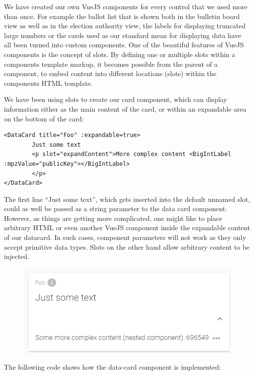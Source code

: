 We have created our own VueJS components for every control that we used more than once. For example the ballot list that is shown both in the bulletin board view as well as in the election authority view, the labels for displaying truncated large numbers or the cards used as our standard mean for displaying data have all been turned into custom components. One of the beautiful features of VueJS components is the concept of slots. By defining one or multiple slots within a components template markup, it becomes possible from the parent of a component, to embed content into different locations (slots) within the components HTML template.

We have been using slots to create our card component, which can display information either as the main content of the card, or within an expandable area on the bottom of the card:

\begin{verbatim}
<DataCard title="Foo" :expandable=true>
		Just some text
		<p slot="expandContent">More complex content <BigIntLabel :mpzValue="publicKey"></BigIntLabel>
		</p>
</DataCard>
\end{verbatim}
The first line "`Just some text"', which gets inserted into the default unnamed slot, could as well be passed as a string parameter to the data card component. However, as things are getting more complicated, one might like to place arbitrary HTML or even another VueJS component inside the expandable content of our datacard. In such cases, component parameters will not work as they only accept primitive data types. Slots on the other hand allow arbitrary content to be injected.
\begin{figure}[h!]
\begin{center}
\includegraphics[scale=1.0]{assets/datacardexample.PNG}\\
\label{DataCardXample}%
\end{center}
\end{figure}
The following code shows how the data-card component is implemented:

